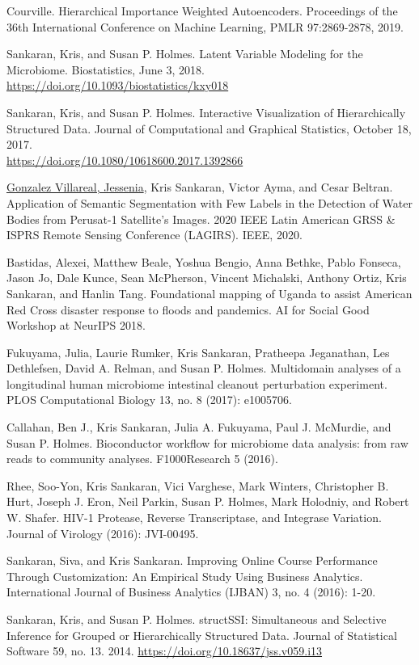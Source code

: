\documentclass[letterpaper]{article}
\renewenvironment{itemize}{
  \begin{list}{}{
    \setlength{\leftmargin}{1.5em}
  }
}{
  \end{list}
}
\begin{document}
\begin{itemize}
  Courville. Hierarchical Importance Weighted Autoencoders. Proceedings of the
  36th International Conference on Machine Learning, PMLR 97:2869-2878, 2019.
 \item Sankaran, Kris, and Susan P. Holmes. Latent Variable Modeling for the
   Microbiome. Biostatistics, June 3, 2018.
   \href{https://doi.org/10.1093/biostatistics/kxy018}{https://doi.org/10.1093/biostatistics/kxy018}
 \item Sankaran, Kris, and Susan P. Holmes. Interactive Visualization of
   Hierarchically Structured Data. Journal of Computational and Graphical
   Statistics, October 18, 2017. \\
   \href{https://doi.org/10.1080/10618600.2017.1392866}{https://doi.org/10.1080/10618600.2017.1392866}
  \item \underline{Gonzalez Villareal, Jessenia}, Kris Sankaran, Victor Ayma,
  and Cesar Beltran. Application of Semantic Segmentation with Few Labels in the
  Detection of Water Bodies from Perusat-1 Satellite’s Images. 2020 IEEE Latin
  American GRSS \& ISPRS Remote Sensing Conference (LAGIRS). IEEE, 2020.
  \item Bastidas, Alexei, Matthew Beale, Yoshua Bengio, Anna Bethke, Pablo
    Fonseca, Jason Jo, Dale Kunce, Sean McPherson, Vincent Michalski, Anthony
    Ortiz, Kris Sankaran, and Hanlin Tang. Foundational mapping of Uganda to
    assist American Red Cross disaster response to floods and pandemics. AI for
    Social Good Workshop at NeurIPS 2018.
  \item Fukuyama, Julia, Laurie Rumker, Kris Sankaran, Pratheepa Jeganathan, Les
    Dethlefsen, David A. Relman, and Susan P. Holmes. Multidomain analyses of a
    longitudinal human microbiome intestinal cleanout perturbation experiment.
    PLOS Computational Biology 13, no. 8 (2017): e1005706.
  \item Callahan, Ben J., Kris Sankaran, Julia A. Fukuyama, Paul J. McMurdie, and
    Susan P. Holmes. Bioconductor workflow for microbiome data analysis: from
    raw reads to community analyses. F1000Research 5 (2016).
  \item Rhee, Soo-Yon, Kris Sankaran, Vici Varghese, Mark Winters, Christopher B.
    Hurt, Joseph J. Eron, Neil Parkin, Susan P. Holmes, Mark Holodniy, and Robert
    W. Shafer. HIV-1 Protease, Reverse Transcriptase, and Integrase Variation.
    Journal of Virology (2016): JVI-00495.
  \item Sankaran, Siva, and Kris Sankaran. Improving Online Course Performance
    Through Customization: An Empirical Study Using Business Analytics.
    International Journal of Business Analytics (IJBAN) 3, no. 4 (2016): 1-20.
\item Sankaran, Kris, and Susan P. Holmes. structSSI: Simultaneous and Selective
  Inference for Grouped or Hierarchically Structured Data. Journal of
  Statistical Software 59, no. 13. 2014. \href{https://doi.org/10.18637/jss.v059.i13}{https://doi.org/10.18637/jss.v059.i13}
\end{itemize}
\end{document}
